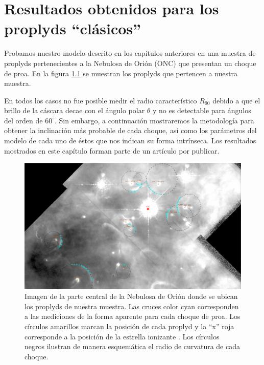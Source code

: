 \chapter[Resultados Obtenidos]{Resultados obtenidos para los proplyds ``clásicos''}
\label{chap:proplyds}
\thispagestyle{empty}
Probamos nuestro modelo descrito en los capítulos anteriores en una muestra de proplyds pertenecientes a la Nebulosa de Orión (ONC) que presentan un choque de proa. En la figura \ref{fig:proplyds-map} se muestran los proplyds que pertencen a nuestra muestra.

En todos los casos no fue posible medir el radio característico $R_{90}$ debido a que el brillo de la cáscara decae con el ángulo polar $\theta$ y no es detectable para ángulos del orden de $60^\circ$. Sin embargo, a continuación mostraremos la metodología para obtener la inclinación más probable de cada choque, así como los parámetros del modelo de cada uno de éstos que nos indican su forma intrínseca. Los resultados mostrados en este capítulo forman parte de un artículo por publicar.

\begin{figure}
  \centering
    \includegraphics[width=\linewidth]{./Figures/LV-full-field-annotated}
    \caption{Imagen de la parte central de la Nebulosa de Orión donde se ubican los proplyds de nuestra muestra. Las cruces color cyan corresponden a las mediciones de la forma aparente para cada choque de proa. Los círculos amarillos marcan la posición de cada proplyd y la ``x'' roja corresponde a la posición de la estrella ionizante \thC{}. Los círculos negros ilustran de manera esquemática el radio de curvatura de cada choque.}
    \label{fig:proplyds-map}
\end{figure}

